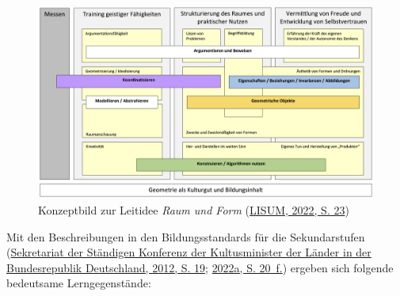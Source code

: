 \documentclass[
]{scrbook}
\theoremstyle{definition}
\theoremstyle{definition}
\theoremstyle{definition}
\theoremstyle{definition}
\theoremstyle{remark}
\begin{document}
\begin{figure}

{\centering \includegraphics[width=1\linewidth]{pictures/12-KonzeptbildRaumForm} 

}

\caption{Konzeptbild zur Leitidee \emph{Raum und Form} (\protect\hyperlink{ref-LISUM2022}{LISUM, 2022, S. 23})}\label{fig:KonzeptRaumForm}
\end{figure}

Mit den Beschreibungen in den Bildungsstandards für die Sekundarstufen (\protect\hyperlink{ref-KMK:2012}{Sekretariat der Ständigen Konferenz der Kultusminister der Länder in der Bundesrepublik Deutschland, 2012, S. 19}; \protect\hyperlink{ref-SekretariatderStandigenKonferenzderKultusministerderLanderinderBundesrepublikDeutschland2022}{2022a, S. 20~f.}) ergeben sich folgende bedeutsame Lerngegenstände:
\end{document}
